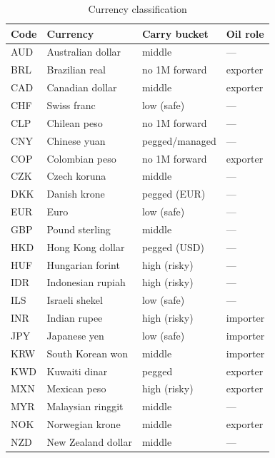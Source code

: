 \begin{table}[htbp]
\centering
\begin{threeparttable}
\caption{Currency classification}
\label{tab:app_ccy}
\small
\begin{tabular*}{\textwidth}{@{\extracolsep{\fill}} ll l l @{}}
\toprule
Code & Currency & Carry bucket & Oil role \\
\midrule
AUD & Australian dollar   & middle            & --- \\
BRL & Brazilian real      & no 1M forward     & exporter \\
CAD & Canadian dollar     & middle            & exporter \\
CHF & Swiss franc         & low (safe)        & --- \\
CLP & Chilean peso        & no 1M forward     & --- \\
CNY & Chinese yuan        & pegged/managed    & --- \\
COP & Colombian peso      & no 1M forward     & exporter \\
CZK & Czech koruna        & middle            & --- \\
DKK & Danish krone        & pegged (EUR)      & --- \\
EUR & Euro                & low (safe)        & --- \\
GBP & Pound sterling      & middle            & --- \\
HKD & Hong Kong dollar    & pegged (USD)      & --- \\
HUF & Hungarian forint    & high (risky)      & --- \\
IDR & Indonesian rupiah   & high (risky)      & --- \\
ILS & Israeli shekel      & low (safe)        & --- \\
INR & Indian rupee        & high (risky)      & importer \\
JPY & Japanese yen        & low (safe)        & importer \\
KRW & South Korean won    & middle            & importer \\
KWD & Kuwaiti dinar       & pegged            & exporter \\
MXN & Mexican peso        & high (risky)      & exporter \\
MYR & Malaysian ringgit   & middle            & --- \\
NOK & Norwegian krone     & middle            & exporter \\
NZD & New Zealand dollar  & middle            & --- \\

\end{tabular*}
\end{threeparttable}
\end{table}

